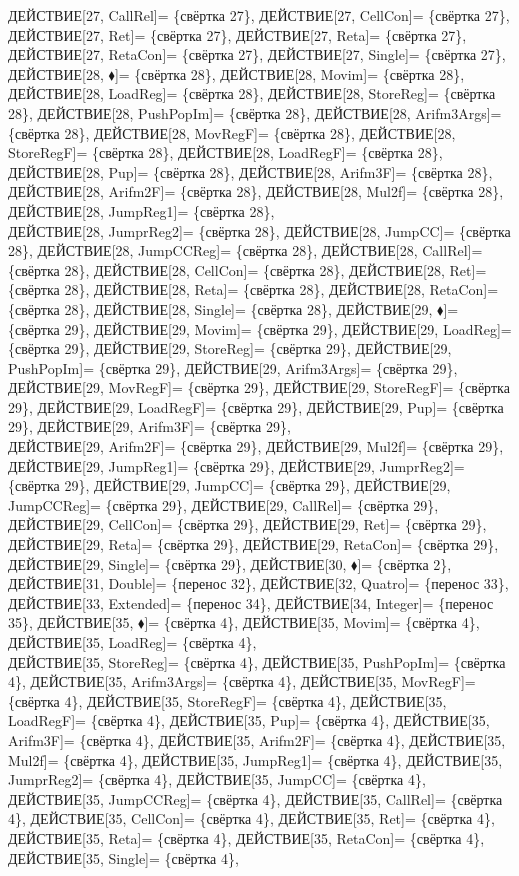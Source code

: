 \documentclass[a0]{a0poster}
\begin{document}
ДЕЙСТВИЕ[27, CallRel]= \{свёртка 27\}, ДЕЙСТВИЕ[27, CellCon]= \{свёртка 27\}, ДЕЙСТВИЕ[27, Ret]= \{свёртка 27\}, ДЕЙСТВИЕ[27, Reta]= \{свёртка 27\}, ДЕЙСТВИЕ[27, RetaCon]= \{свёртка 27\}, ДЕЙСТВИЕ[27, Single]= \{свёртка 27\}, ДЕЙСТВИЕ[28, $\blacklozenge$]= \{свёртка 28\}, ДЕЙСТВИЕ[28, Movim]= \{свёртка 28\}, ДЕЙСТВИЕ[28, LoadReg]= \{свёртка 28\}, ДЕЙСТВИЕ[28, StoreReg]= \{свёртка 28\}, ДЕЙСТВИЕ[28, PushPopIm]= \{свёртка 28\}, ДЕЙСТВИЕ[28, Arifm3Args]= \{свёртка 28\}, ДЕЙСТВИЕ[28, MovRegF]= \{свёртка 28\}, ДЕЙСТВИЕ[28, StoreRegF]= \{свёртка 28\}, ДЕЙСТВИЕ[28, LoadRegF]= \{свёртка 28\}, ДЕЙСТВИЕ[28, Pup]= \{свёртка 28\}, ДЕЙСТВИЕ[28, Arifm3F]= \{свёртка 28\}, ДЕЙСТВИЕ[28, Arifm2F]= \{свёртка 28\}, ДЕЙСТВИЕ[28, Mul2f]= \{свёртка 28\}, ДЕЙСТВИЕ[28, JumpReg1]= \{свёртка 28\}, \\
ДЕЙСТВИЕ[28, JumprReg2]= \{свёртка 28\}, ДЕЙСТВИЕ[28, JumpCC]= \{свёртка 28\}, ДЕЙСТВИЕ[28, JumpCCReg]= \{свёртка 28\}, ДЕЙСТВИЕ[28, CallRel]= \{свёртка 28\}, ДЕЙСТВИЕ[28, CellCon]= \{свёртка 28\}, ДЕЙСТВИЕ[28, Ret]= \{свёртка 28\}, ДЕЙСТВИЕ[28, Reta]= \{свёртка 28\}, ДЕЙСТВИЕ[28, RetaCon]= \{свёртка 28\}, ДЕЙСТВИЕ[28, Single]= \{свёртка 28\}, ДЕЙСТВИЕ[29, $\blacklozenge$]= \{свёртка 29\}, ДЕЙСТВИЕ[29, Movim]= \{свёртка 29\}, ДЕЙСТВИЕ[29, LoadReg]= \{свёртка 29\}, ДЕЙСТВИЕ[29, StoreReg]= \{свёртка 29\}, ДЕЙСТВИЕ[29, PushPopIm]= \{свёртка 29\}, ДЕЙСТВИЕ[29, Arifm3Args]= \{свёртка 29\}, ДЕЙСТВИЕ[29, MovRegF]= \{свёртка 29\}, ДЕЙСТВИЕ[29, StoreRegF]= \{свёртка 29\}, ДЕЙСТВИЕ[29, LoadRegF]= \{свёртка 29\}, ДЕЙСТВИЕ[29, Pup]= \{свёртка 29\}, ДЕЙСТВИЕ[29, Arifm3F]= \{свёртка 29\}, \\
ДЕЙСТВИЕ[29, Arifm2F]= \{свёртка 29\}, ДЕЙСТВИЕ[29, Mul2f]= \{свёртка 29\}, ДЕЙСТВИЕ[29, JumpReg1]= \{свёртка 29\}, ДЕЙСТВИЕ[29, JumprReg2]= \{свёртка 29\}, ДЕЙСТВИЕ[29, JumpCC]= \{свёртка 29\}, ДЕЙСТВИЕ[29, JumpCCReg]= \{свёртка 29\}, ДЕЙСТВИЕ[29, CallRel]= \{свёртка 29\}, ДЕЙСТВИЕ[29, CellCon]= \{свёртка 29\}, ДЕЙСТВИЕ[29, Ret]= \{свёртка 29\}, ДЕЙСТВИЕ[29, Reta]= \{свёртка 29\}, ДЕЙСТВИЕ[29, RetaCon]= \{свёртка 29\}, ДЕЙСТВИЕ[29, Single]= \{свёртка 29\}, ДЕЙСТВИЕ[30, $\blacklozenge$]= \{свёртка 2\}, ДЕЙСТВИЕ[31, Double]= \{перенос 32\}, ДЕЙСТВИЕ[32, Quatro]= \{перенос 33\}, ДЕЙСТВИЕ[33, Extended]= \{перенос 34\}, ДЕЙСТВИЕ[34, Integer]= \{перенос 35\}, ДЕЙСТВИЕ[35, $\blacklozenge$]= \{свёртка 4\}, ДЕЙСТВИЕ[35, Movim]= \{свёртка 4\}, ДЕЙСТВИЕ[35, LoadReg]= \{свёртка 4\}, \\
ДЕЙСТВИЕ[35, StoreReg]= \{свёртка 4\}, ДЕЙСТВИЕ[35, PushPopIm]= \{свёртка 4\}, ДЕЙСТВИЕ[35, Arifm3Args]= \{свёртка 4\}, ДЕЙСТВИЕ[35, MovRegF]= \{свёртка 4\}, ДЕЙСТВИЕ[35, StoreRegF]= \{свёртка 4\}, ДЕЙСТВИЕ[35, LoadRegF]= \{свёртка 4\}, ДЕЙСТВИЕ[35, Pup]= \{свёртка 4\}, ДЕЙСТВИЕ[35, Arifm3F]= \{свёртка 4\}, ДЕЙСТВИЕ[35, Arifm2F]= \{свёртка 4\}, ДЕЙСТВИЕ[35, Mul2f]= \{свёртка 4\}, ДЕЙСТВИЕ[35, JumpReg1]= \{свёртка 4\}, ДЕЙСТВИЕ[35, JumprReg2]= \{свёртка 4\}, ДЕЙСТВИЕ[35, JumpCC]= \{свёртка 4\}, ДЕЙСТВИЕ[35, JumpCCReg]= \{свёртка 4\}, ДЕЙСТВИЕ[35, CallRel]= \{свёртка 4\}, ДЕЙСТВИЕ[35, CellCon]= \{свёртка 4\}, ДЕЙСТВИЕ[35, Ret]= \{свёртка 4\}, ДЕЙСТВИЕ[35, Reta]= \{свёртка 4\}, ДЕЙСТВИЕ[35, RetaCon]= \{свёртка 4\}, ДЕЙСТВИЕ[35, Single]= \{свёртка 4\}, 
\\
 
\end{document}
